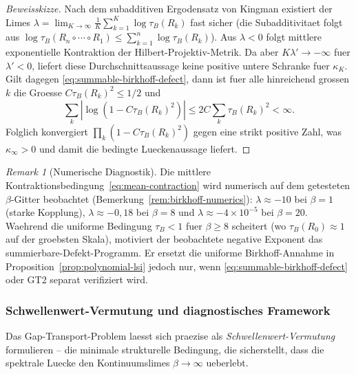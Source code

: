 \documentclass[12pt,a4paper]{article}
\theoremstyle{definition}
\theoremstyle{plain}
\theoremstyle{remark}
\newtheorem{remark}[definition]{Remark}
\begin{document}
\begin{proof}[Beweisskizze]
Nach dem subadditiven Ergodensatz von Kingman existiert der Limes $\lambda = \lim_{K \to \infty} \frac{1}{K} \sum_{k=1}^{K} \log \tau_B(R_k)$ fast sicher (die Subadditivitaet folgt aus $\log \tau_B(R_n \circ \cdots \circ R_1) \leq \sum_{k=1}^n \log \tau_B(R_k)$). Aus $\lambda < 0$ folgt mittlere exponentielle Kontraktion der Hilbert-Projektiv-Metrik. Da aber $K\lambda' \to -\infty$ fuer $\lambda'<0$, liefert diese Durchschnittsaussage keine positive untere Schranke fuer $\kappa_K$. Gilt dagegen \eqref{eq:summable-birkhoff-defect}, dann ist fuer alle hinreichend grossen $k$ die Groesse $C\tau_B(R_k)^2 \leq 1/2$ und
\[
  \sum_k |\log(1-C\tau_B(R_k)^2)|
  \leq 2C\sum_k \tau_B(R_k)^2 < \infty .
\]
Folglich konvergiert $\prod_k(1-C\tau_B(R_k)^2)$ gegen eine strikt positive Zahl, was $\kappa_\infty>0$ und damit die bedingte Lueckenaussage liefert.
\end{proof}

\begin{remark}[Numerische Diagnostik]\label{rem:kingman-numerical}
Die mittlere Kontraktionsbedingung~\eqref{eq:mean-contraction} wird numerisch auf dem getesteten $\beta$-Gitter beobachtet (Bemerkung~\ref{rem:birkhoff-numerics}): $\lambda \approx -10$ bei $\beta=1$ (starke Kopplung), $\lambda \approx -0{,}18$ bei $\beta=8$ und $\lambda \approx -4 \times 10^{-5}$ bei $\beta=20$. Waehrend die uniforme Bedingung $\tau_B < 1$ fuer $\beta \geq 8$ scheitert (wo $\tau_B(R_0) \approx 1$ auf der groebsten Skala), motiviert der beobachtete negative Exponent das summierbare-Defekt-Programm. Er ersetzt die uniforme Birkhoff-Annahme in Proposition~\ref{prop:polynomial-lsi} jedoch nur, wenn \eqref{eq:summable-birkhoff-defect} oder GT2 separat verifiziert wird.
\end{remark}

\subsubsection*{Schwellenwert-Vermutung und diagnostisches Framework}

Das Gap-Transport-Problem laesst sich praezise als \emph{Schwellenwert-Vermutung} formulieren -- die minimale strukturelle Bedingung, die sicherstellt, dass die spektrale Luecke den Kontinuumslimes $\beta \to \infty$ ueberlebt.
\end{document}
